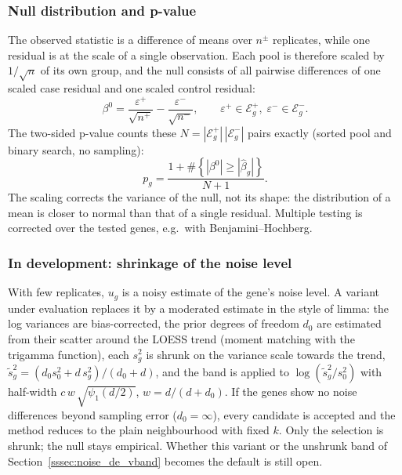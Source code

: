         \subsubsection{Null distribution and p-value}

            The observed statistic is a difference of means over $n^{\pm}$ replicates, while one residual is at the scale of a single observation. Each pool is therefore scaled by $1/\sqrt{n}$ of its own group, and the null consists of all pairwise differences of one scaled case residual and one scaled control residual:
            \[
                \beta^{0} = \frac{\varepsilon^{+}}{\sqrt{n^{+}}} - \frac{\varepsilon^{-}}{\sqrt{n^{-}}}, \qquad \varepsilon^{+} \in \mathcal{E}^{+}_{g},\; \varepsilon^{-} \in \mathcal{E}^{-}_{g}.
            \]
            The two-sided p-value counts these $N = |\mathcal{E}^{+}_{g}|\,|\mathcal{E}^{-}_{g}|$ pairs exactly (sorted pool and binary search, no sampling):
            \[
                p_g = \frac{1 + \#\left\{\left|\beta^{0}\right| \ge \left|\hat\beta_g\right|\right\}}{N + 1}.
            \]
            The scaling corrects the variance of the null, not its shape: the distribution of a mean is closer to normal than that of a single residual. Multiple testing is corrected over the tested genes, e.g.\ with Benjamini--Hochberg.

        \subsubsection{In development: shrinkage of the noise level}

            With few replicates, $u_g$ is a noisy estimate of the gene's noise level. A variant under evaluation replaces it by a moderated estimate in the style of limma: the log variances are bias-corrected, the prior degrees of freedom $d_0$ are estimated from their scatter around the LOESS trend (moment matching with the trigamma function), each $s^2_g$ is shrunk on the variance scale towards the trend, $\tilde{s}^2_g = (d_0 s^2_0 + d\, s^2_g)/(d_0 + d)$, and the band is applied to $\log(\tilde{s}^2_g / s^2_0)$ with half-width $c\,w\,\sqrt{\psi_1(d/2)}$, $w = d/(d + d_0)$. If the genes show no noise differences beyond sampling error ($d_0 = \infty$), every candidate is accepted and the method reduces to the plain neighbourhood with fixed $k$. Only the selection is shrunk; the null stays empirical. Whether this variant or the unshrunk band of Section~\ref{sssec:noise_de_vband} becomes the default is still open.

